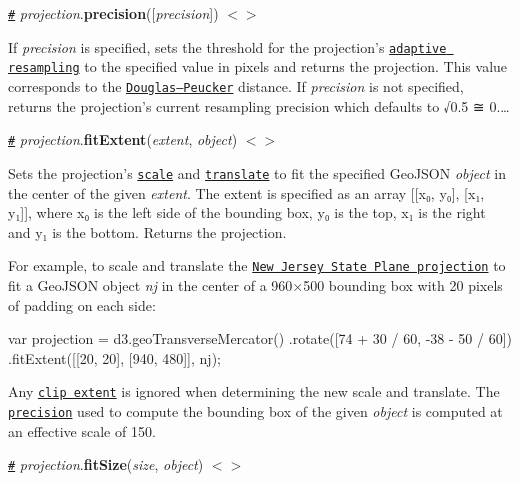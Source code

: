 \href{#projection_precision}{\tt \#} {\itshape projection}.{\bfseries precision}(\mbox{[}{\itshape precision}\mbox{]}) \href{https://github.com/d3/d3-geo/blob/master/src/projection/index.js#L76}{\tt $<$$>$}

If {\itshape precision} is specified, sets the threshold for the projection’s \href{https://bl.ocks.org/mbostock/3795544}{\tt adaptive resampling} to the specified value in pixels and returns the projection. This value corresponds to the \href{http://en.wikipedia.org/wiki/Ramer–Douglas–Peucker_algorithm}{\tt Douglas–\+Peucker} distance. If {\itshape precision} is not specified, returns the projection’s current resampling precision which defaults to √0.5 ≅ 0.…

\href{#projection_fitExtent}{\tt \#} {\itshape projection}.{\bfseries fit\+Extent}({\itshape extent}, {\itshape object}) \href{https://github.com/d3/d3-geo/blob/master/src/projection/index.js#L80}{\tt $<$$>$}

Sets the projection’s \href{#projection_scale}{\tt scale} and \href{#projection_translate}{\tt translate} to fit the specified Geo\+J\+S\+ON {\itshape object} in the center of the given {\itshape extent}. The extent is specified as an array \mbox{[}\mbox{[}x₀, y₀\mbox{]}, \mbox{[}x₁, y₁\mbox{]}\mbox{]}, where x₀ is the left side of the bounding box, y₀ is the top, x₁ is the right and y₁ is the bottom. Returns the projection.

For example, to scale and translate the \href{https://bl.ocks.org/mbostock/5126418}{\tt New Jersey State Plane projection} to fit a Geo\+J\+S\+ON object {\itshape nj} in the center of a 960×500 bounding box with 20 pixels of padding on each side\+:


\begin{DoxyCode}
var projection = d3.geoTransverseMercator()
    .rotate([74 + 30 / 60, -38 - 50 / 60])
    .fitExtent([[20, 20], [940, 480]], nj);
\end{DoxyCode}


Any \href{#projection_clipExtent}{\tt clip extent} is ignored when determining the new scale and translate. The \href{#projection_precision}{\tt precision} used to compute the bounding box of the given {\itshape object} is computed at an effective scale of 150.

\href{#projection_fitSize}{\tt \#} {\itshape projection}.{\bfseries fit\+Size}({\itshape size}, {\itshape object}) \href{https://github.com/d3/d3-geo/blob/master/src/projection/index.js#L82}{\tt $<$$>$}

